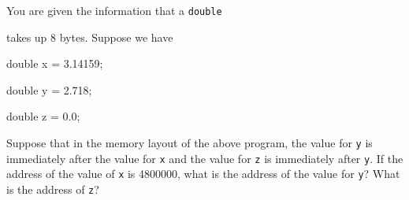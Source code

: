 You are given the information that a \texttt{double}

takes up 8 bytes. Suppose we have



\begin{consolethree}[escapeinside=||]

double x = 3.14159;

double y = 2.718;

double z = 0.0;

\end{consolethree}



Suppose that in the memory layout of the above program, the value for \texttt{y} is immediately after the value for \texttt{x} and the value for \texttt{z} is immediately after \texttt{y}. If the address of the value of \texttt{x} is 4800000, what is the address of the value for \texttt{y}? What is the address of \texttt{z}?

